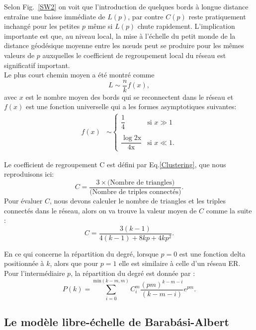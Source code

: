 Selon Fig.~\ref{SW2} on voit que l'introduction de quelques bords à longue distance entraîne une baisse immédiate de $L(p)$, par contre $C(p)$ reste pratiquement inchangé pour les petites $p$ même si $L(p)$ chute rapidement. L'implication importante est que, au niveau local, la mise à l'échelle du petit monde de la distance géodésique moyenne entre les nœuds peut se produire pour les mêmes valeurs de $p$ auxquelles le coefficient de regroupement local du réseau est significatif important.\\
Le plus court chemin moyen a été montré comme \cite{Barthelemy-Amaral1999,Newman-al2000}
\begin{equation}
  L\sim \frac{n}{k}f(x),
\end{equation}
avec $x$ est le nombre moyen des bords qui se reconnectent dans le réseau et $f(x)$ est une fonction universelle qui a les formes asymptotiques suivantes:
\begin{align}
f(x)&\sim
\begin{cases}
\dfrac{1}{4} & \text{si } x \gg1\\
\\
\dfrac{\log\mathrm{2x}}{\mathrm{4x}}& \text{si } x \ll1.
\end{cases}
\end{align}

   Le coefficient de regroupement C est défini par Eq.\ref{Clustering}, que nous reproduisons ici:
 \begin{equation}
 C=\frac{3\times\text{(Nombre de triangles)}}{\text{(Nombre de triples connectés)}}.
 \end{equation}  
Pour évaluer $C$, nous devons calculer le nombre de triangles et les triples connectés dans le réseau, alors on va trouve la valeur moyen de $C$ comme la suite \cite{Newman2010-558}:
\begin{equation}
C=\frac{3(k-1)}{4(k-1)+8kp+4kp^2}.
\end{equation}  

En ce qui concerne la répartition du degré, lorsque $p=0$ est une fonction delta positionnée à $k$, alors que pour $p=1$ elle est similaire à celle d'un réseau ER. Pour l'intermédiaire $p$, la répartition du degré est donnée par \cite{Barrat-Weigt2000}:
\begin{equation}
P(k)=\sum_{i=0}^{\text{min}(k-m,m)}C_i^m\frac{(pm)^{k-m-i}}{(k-m-i)}e^{pm}.
\end{equation} 

   \subsection{Le modèle libre-échelle de Barabási-Albert}
   
